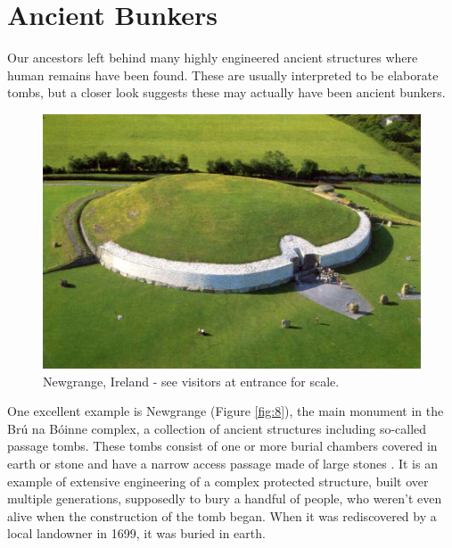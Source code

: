 \documentclass[10pt,twocolumn,letterpaper]{article}
\begin{document}
\section{Ancient Bunkers}

Our ancestors left behind many highly engineered ancient structures where human remains have been found. These are usually interpreted to be elaborate tombs, but a closer look suggests these may actually have been ancient bunkers.

\begin{figure}[b]
\begin{center}
   \includegraphics[width=1\linewidth]{ww19.jpg}
\end{center}
   \caption{Newgrange, Ireland - see visitors at entrance for scale.}
\label{fig:8}
\label{fig:onecol}
\end{figure}

One excellent example is Newgrange (Figure \ref{fig:8}), the main monument in the Brú na Bóinne complex, a collection of ancient structures including so-called passage tombs. These tombs consist of one or more burial chambers covered in earth or stone and have a narrow access passage made of large stones \cite{70}. It is an example of extensive engineering of a complex protected structure, built over multiple generations, supposedly to bury a handful of people, who weren’t even alive when the construction of the tomb began. When it was rediscovered by a local landowner in 1699, it was buried in earth.
\end{document}
